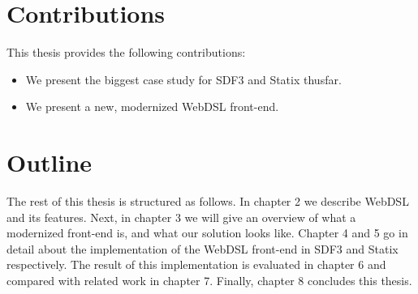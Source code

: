   \section{Contributions}
    This thesis provides the following contributions:

    \begin{itemize}
      \item We present the biggest case study for SDF3 and Statix thusfar.
      \item We present a new, modernized WebDSL front-end.
    \end{itemize}

  \section{Outline}
    The rest of this thesis is structured as follows. In chapter 2 we describe WebDSL and its features. Next, in chapter 3 we will give an overview of what a modernized front-end is, and what our solution looks like. Chapter 4 and 5 go in detail about the implementation of the WebDSL front-end in SDF3 and Statix respectively. The result of this implementation is evaluated in chapter 6 and compared with related work in chapter 7. Finally, chapter 8 concludes this thesis.
